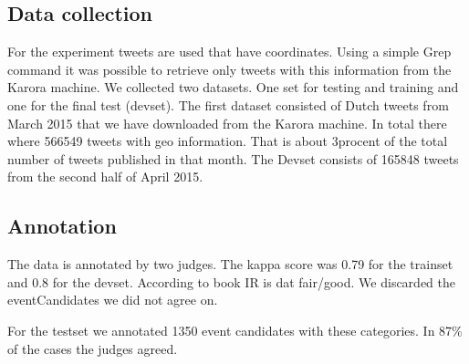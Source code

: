 \documentclass[
10pt, %
a4paper, %
oneside, %
headinclude,footinclude, %
BCOR5mm, %
]{scrartcl}
\begin{document}
\subsection{Data collection}
For the experiment tweets are used that have coordinates. Using a simple Grep command it was possible to retrieve only tweets with this information from the Karora machine. We collected two datasets. One set for testing and training and one for the final test (devset). 
The first dataset consisted of Dutch tweets from March 2015 that we have downloaded from the Karora machine. In total there where 566549 tweets with geo information. That is about 3procent of the total number of tweets published in that month. The Devset consists of 165848 tweets from the second half of April 2015.

\subsection{Annotation}
The data is annotated by two judges. The kappa score was 0.79 for the trainset and 0.8 for the devset. According to book IR is dat fair/good. We discarded the eventCandidates we did not agree on.

For the testset we annotated 1350 event candidates with these categories. In 87\% of the cases the judges agreed.
\end{document}
